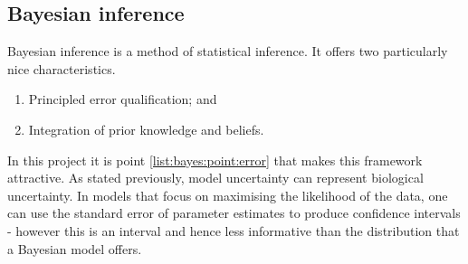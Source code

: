 \documentclass[12pt]{article} %
\begin{document}
	\subsection{Bayesian inference}	
	Bayesian inference is a method of statistical inference. It offers two particularly nice characteristics.
	\begin{enumerate} \label{list:bayes}
		\item \label{list:bayes:point:error} Principled error qualification; and 
		\item Integration of prior knowledge and beliefs. %
	\end{enumerate}
	In this project it is point \ref{list:bayes:point:error} that makes this framework attractive. As stated previously, model uncertainty can represent biological uncertainty. In models that focus on maximising the likelihood of the data, one can use the standard error of parameter estimates to produce confidence intervals - however this is an interval and hence less informative than the distribution that a Bayesian model offers.
	
\end{document}
